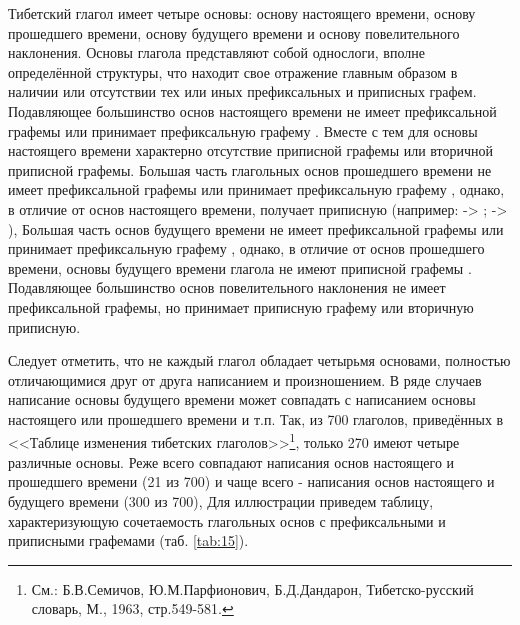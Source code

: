 Тибетский глагол имеет четыре основы: основу настоящего времени, основу прошедшего времени, основу будущего времени и основу повелительного наклонения. Основы глагола представляют собой однослоги, вполне определённой структуры, что находит свое отражение главным образом в наличии или отсутствии тех или иных префиксальных и приписных графем. Подавляющее большинство основ настоящего времени не имеет префиксальной графемы или принимает префиксальную графему . Вместе с тем для основы настоящего времени характерно отсутствие приписной графемы  или вторичной приписной графемы. Большая часть глагольных основ прошедшего времени не имеет префиксальной графемы или принимает префиксальную графему , однако, в отличие от основ настоящего времени, получает приписную  (например:  -> ;  -> ), Большая часть основ будущего времени не имеет префиксальной графемы или принимает префиксальную графему , однако, в отличие от основ прошедшего времени, основы будущего времени глагола не имеют приписной графемы . Подавляющее большинство основ повелительного наклонения не имеет префиксальной графемы, но принимает приписную графему  или вторичную приписную.

Следует отметить, что не каждый глагол обладает четырьмя основами, полностью отличающимися друг от друга написанием и произношением. В ряде случаев написание основы будущего времени может совпадать с написанием основы настоящего или прошедшего времени и т.п. Так, из 700 глаголов, приведённых в <<Таблице изменения тибетских
глаголов>>\footnote[33]{См.: Б.В.Семичов, Ю.М.Парфионович, Б.Д.Дандарон, Тибетско-русский словарь, М., 1963, стр.549-581.}, только 270 имеют четыре различные основы. Реже всего совпадают написания основ настоящего и прошедшего времени (21 из 700) и чаще всего - написания основ настоящего и будущего времени (300 из 700),
Для иллюстрации приведем таблицу, характеризующую сочетаемость глагольных основ с префиксальными и приписными графемами (таб. \ref{tab:15}).

